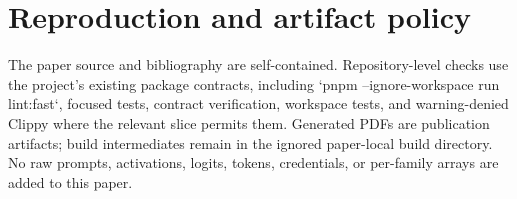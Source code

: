 \documentclass[11pt,twoside]{article}
\begin{document}
\section{Reproduction and artifact policy}

  The paper source and bibliography are self-contained. Repository-level checks use the project's existing package contracts, including `pnpm --ignore-workspace run lint:fast`, focused tests, contract verification, workspace tests, and warning-denied Clippy where the relevant slice permits them. Generated PDFs are publication artifacts; build intermediates remain in the ignored paper-local build directory. No raw prompts, activations, logits, tokens, credentials, or per-family arrays are added to this paper.

\begingroup
\sloppy
\printbibliography[heading=bibintoc,title={References}]
\endgroup
\end{document}

